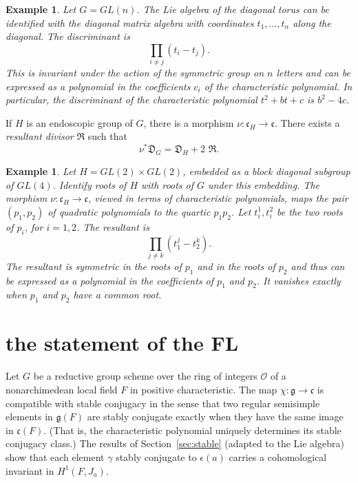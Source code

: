 \documentclass[brochure,english,12pt]{bourbaki}
\newtheorem{example}[equation]{Example}
\def\g{\mathfrak{g}}
\def\cc{\mathfrak{c}}
\def\DIV{{\mathfrak{D}}}
\def\RDIV{{\mathfrak{R}}}
\def\O{{\mathcal O}}
\begin{document}
\begin{example} Let $G=GL(n)$.  The Lie algebra of the diagonal torus
  can be identified with the diagonal matrix algebra with coordinates
  $t_1,\ldots,t_n$ along the diagonal.  The discriminant is
\[\prod_{i\ne j} (t_i - t_j).\]
This  is invariant under the action of the symmetric group on $n$ letters 
and can be expressed as a polynomial in the coefficients $c_i$ of the characteristic polynomial.
In particular, the discriminant of the characteristic polynomial $t^2 + b t + c$ is $b^2 - 4 c$.
\end{example}

If $H$ is an endoscopic group of $G$, there is a morphism $\nu:\cc_H\to \cc$.  There exists
a {\it resultant divisor} $\RDIV$ such that
\[
\nu^*\DIV_G = \DIV_H + 2\,\, \RDIV.
\]

\begin{example} Let $H=GL(2)\times GL(2)$, embedded as a block
  diagonal subgroup of $GL(4)$.  Identify roots of $H$ with roots of $G$ under this embedding.
 The morphism $\nu:\cc_H\to \cc$,
  viewed in terms of characteristic polynomials, maps the pair
  $(p_1,p_2)$ of quadratic polynomials to the quartic $p_1p_2$.  Let
  $t^1_i,t^2_i$ be the two roots of $p_i$, for $i=1,2$.  The resultant is
\[
\prod_{j\ne k} (t^j_1 - t^k_2).
\]
  The
resultant is symmetric in the roots of $p_1$ and in the roots of $p_2$
and thus can be expressed as a polynomial  in the coefficients
of $p_1$ and $p_2$.  It vanishes exactly when $p_1$ and $p_2$ have a common root.
\end{example}



\section{the statement of the FL}\label{sec:statement}

Let $G$ be a reductive group scheme over the ring of integers $\O$ of
a nonarchimedean local field $F$ in positive characteristic.  The map $\chi:\g\to\cc$
is compatible with stable conjugacy in the sense that two
regular semisimple elements in $\g(F)$ are stably conjugate exactly
when they have the same image in $\cc(F)$.  (That is, the
characteristic polynomial uniquely determines its stable
conjugacy class.)    The results of
Section~\ref{sec:stable} (adapted to the Lie algebra)
show that each element $\gamma$ stably conjugate to
$\epsilon(a)$ carries a cohomological invariant in $H^1(F,J_a)$.  
\end{document}
